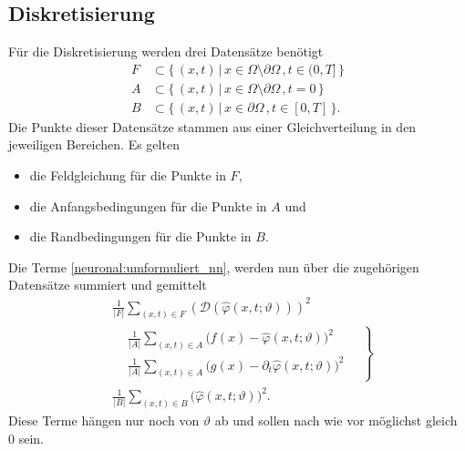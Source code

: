 \subsection{Diskretisierung}\label{neuronal:subsection:diskretierung}
%
%
Für die Diskretisierung werden drei Datensätze benötigt
\begin{equation}
    \begin{aligned}
        F &\subset \{\, (x, t) \,|\, x \in \Omega \setminus \partial \Omega\,, t \in (0,T] \,\}\\
        A &\subset \{\, (x, t) \,|\, x \in \Omega \setminus \partial \Omega\,, t = 0 \,\}\\
        B &\subset \{\, (x, t) \,|\, x \in \partial \Omega\,, t \in [0, T] \,\}.
    \end{aligned}
\end{equation}
Die Punkte dieser Datensätze stammen aus einer Gleichverteilung in den jeweiligen Bereichen.
%
Es gelten
\begin{itemize}
    \item die Feldgleichung für die Punkte in $F$,
    \item die Anfangsbedingungen für die Punkte in $A$ und
    \item die Randbedingungen für die Punkte in $B$.
\end{itemize}
Die Terme \eqref{neuronal:umformuliert_nn}, werden nun über die zugehörigen Datensätze summiert und gemittelt
\begin{align}
  &\frac{1}{\lvert F \rvert} \sum_{(x,t)\in F}^{} \left(\mathcal{D}(\hat{\varphi}(x, t; \vartheta))\right)^2
    \label{neuronal:feldgleichung_umformuliert_netz_disk}
\\
    &\!\left.\begin{aligned}
        &\frac{1}{\lvert A \rvert}
	\sum_{(x,t)\in A}
	\bigl(f(x) - \hat{\varphi}(x, t; \vartheta)\bigr)^2\\
        &\frac{1}{\lvert A \rvert}
	\sum_{(x,t)\in A}
	\bigl(g(x) - \partial_t \hat{\varphi}(x, t; \vartheta)\bigr)^2
    \end{aligned}
	\quad\right\}
    \label{neuronal:anfangsbedingung_umformuliert_netz_disk}
\\
        &\frac{1}{\lvert B \rvert}
	\sum_{(x,t)\in B}
	\bigl(\hat{\varphi}(x, t; \vartheta)\bigr)^2 .
    \label{neuronal:randbedingung_umformuliert_netz_disk}
\end{align}
Diese Terme hängen nur noch von $\vartheta$ ab und sollen nach wie vor möglichst gleich 0 sein.
